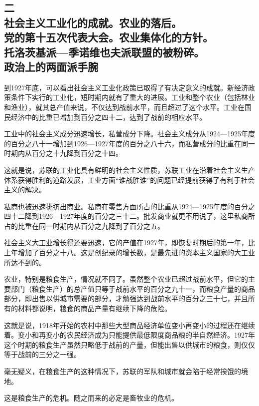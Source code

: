 \subsection[二\q 社会主义工业化的成就。农业的落后。党的第十五次代表大会。农业集体化的方针。托洛茨基派—季诺维也夫派联盟的被粉碎。政治上的两面派手腕]{二\\社会主义工业化的成就。农业的落后。\\党的第十五次代表大会。农业集体化的方针。\\托洛茨基派—季诺维也夫派联盟的被粉碎。\\政治上的两面派手腕}

到1927年底，可以看出社会主义工业化政策已取得了有决定意义的成就。新经济政策条件下实行的工业化，短时期内就有了重大的进展。工业和整个农业（包括林业和渔业），就其总产值来说，不仅达到战前水平，而且超过了这个水平。工业在国民经济中的比重已增加到百分之四十二，达到了战前的相应水平。

工业中的社会主义成分迅速增长，私营成分下降。社会主义成分从1924—1925年度的百分之八十一增加到1926—1927年度的百分之八十六，而私营成分的比重在同一时期内从百分之十九降到百分之十四。

这就是说，苏联的工业化具有鲜明的社会主义性质，苏联工业在沿着社会主义生产体系获得胜利的道路发展，工业方面“谁战胜谁”的问题已经提前获得了有利于社会主义的解决。

私商也被迅速排挤出商业。私商在零售方面所占的比重从1924—1925年度的百分之四十二降到1926—1927年度的百分之三十二。批发商业就更不用说了，这里私商所占的比重在同一时期内从百分之九降到了百分之五。

社会主义大工业增长得还要迅速，它的产值在1927年，即恢复时期后的第一年，比上年增加了百分之十八。这是创纪录的增长数，是最先进的资本主义国家的大工业所达不到的。

农业，特别是粮食生产，情况就不同了。虽然整个农业已超过战前水平，但它的主要部门（粮食生产）的总产值只等于战前水平的百分之九十一，而粮食产量的商品部分，即出售以供城市需要的部分，才勉强达到战前水平的百分之三十七，并且所有的材料都说明，粮食的商品产量有继续下降的危险。

这就是说，1918年开始的农村中那些大型商品经济单位变小再变小的过程还在继续着。变小和再变小的农民经济成为只能提供最低限度商品粮的半自然经济。1927年这个时期的粮食生产虽然只略低于战前的产量，但能出售以供城市的粮食，则仅仅等于战前的三分之一强。

毫无疑义，在粮食生产的这种情况下，苏联的军队和城市就会陷于经常挨饿的境地。

这是粮食生产的危机。随之而来的必定是畜牧业的危机。

